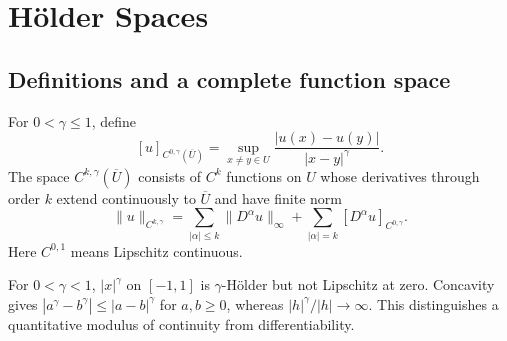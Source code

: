 \section{Hölder Spaces}
\label{sec:5-1}

\subsection{Definitions and a complete function space}
\begin{definition}[Evans \S5.1]
For $0<\gamma\leq1$, define
\[
 [u]_{C^{0,\gamma}(\overline U)}
 =\sup_{x\ne y\in U}\frac{|u(x)-u(y)|}{|x-y|^\gamma}.
\]
The space $C^{k,\gamma}(\overline U)$ consists of $C^k$ functions on $U$
whose derivatives through order $k$ extend continuously to $\overline U$
and have finite norm
\[
 \|u\|_{C^{k,\gamma}}
 =\sum_{|\alpha|\leq k}\|D^\alpha u\|_\infty
 +\sum_{|\alpha|=k}[D^\alpha u]_{C^{0,\gamma}}.
\]
Here $C^{0,1}$ means Lipschitz continuous.
\end{definition}
\Needspace{45mm}
For $0<\gamma<1$, $|x|^\gamma$ on $[-1,1]$ is $\gamma$-H\"older
but not Lipschitz at zero. Concavity gives
$|a^\gamma-b^\gamma|\leq|a-b|^\gamma$ for $a,b\geq0$, whereas
$|h|^\gamma/|h|\to\infty$. This distinguishes a quantitative modulus of
continuity from differentiability.

